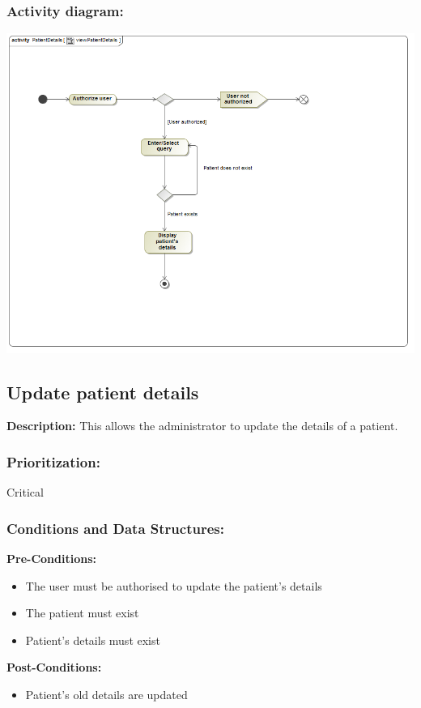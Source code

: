 \subsubsection{Activity diagram:}
\includegraphics[width=1\linewidth]{./Graphics/viewPatientDetails.png}

\subsection{Update patient details}
\textbf{Description:}
This allows the administrator to update the details of a patient.
\subsubsection{Prioritization:}
Critical
\subsubsection{Conditions and Data Structures:}
\textbf{Pre-Conditions:}
	\begin{itemize}
	\item The user must be authorised to update the patient's details
	\item The patient must exist
	\item Patient's details must exist
	\end{itemize}
\textbf{Post-Conditions:}
	\begin{itemize}
	\item Patient's old details are updated
	\end{itemize}	
